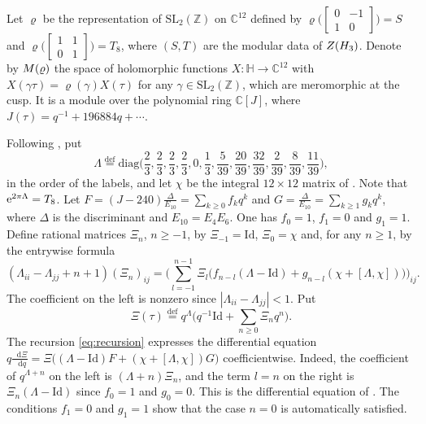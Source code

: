 \documentclass[leqno]{article}
\newcommand{\Cbb}{\ensuremath{\mathbb{C}}}
\newcommand{\diag}{\mathrm{diag}}
\let\cal\relax
\newcommand{\cal}{\mathcal}
\newcommand{\Z}{\ensuremath{\mathbb{Z}}}
\newcommand{\Id}{\mathrm{Id}}
\renewcommand{\geq}{\ensuremath{\geqslant}}
\newcommand{\co}{\colon}
\let\i\relax
\newcommand{\i}{\mathrm{i}}
\newcommand{\ov}{\overset}
\renewcommand{\d}{\mathop{}\mathopen{}\mathrm{d}}
\newcommand{\e}{\mathrm{e}}
\renewcommand{\d}{\mathop{}\mathopen{}\mathrm{d}}
\numberwithin{equation}{section}
\begin{document}
Let $\varrho$ be the representation of $\mathrm{SL}_2(\Z)$ on $\Cbb^{12}$ defined by $\varrho\big(\begin{bmatrix}0&-1\\1&0\end{bmatrix}\big) = S$ and $\varrho\big(\begin{bmatrix}1&1\\0&1\end{bmatrix}\big) = T_8$, where $(S,T)$ are the modular data of $Z(\cal H_3)$. Denote by $\cal M(\varrho)$ the space of holomorphic functions $X \co \mathbb H \to \Cbb^{12}$ with $X(\gamma\tau) = \varrho(\gamma)X(\tau)$ for any $\gamma \in \mathrm{SL}_2(\Z)$, which are meromorphic at the cusp. It is a module over the polynomial ring $\Cbb[J]$, where $J(\tau) = q^{-1}+196884q+\cdots$.

Following \cite[equation (2.7) pp.~21--22]{EvG11}, put
\begin{equation}
\label{eq:Lambda}
\Lambda \ov{\mathrm{def}}{=} \diag\Big(\frac{2}{3},\frac{2}{3},\frac{2}{3},\frac{2}{3},0,\frac{1}{3},\frac{5}{39},\frac{20}{39},\frac{32}{39},\frac{2}{39},\frac{8}{39},\frac{11}{39}\Big),
\end{equation}
in the order of the labels, and let $\chi$ be the integral $12 \times 12$ matrix of \cite[equation (2.7)]{EvG11}. Note that $\e^{2\pi\i\Lambda} = T_8$. Let $F = (J-240)\frac{\Delta}{E_{10}} = \sum_{k \geq 0}f_kq^k$ and $G = \frac{\Delta}{E_{10}} = \sum_{k \geq 1}g_kq^k$, where $\Delta$ is the discriminant and $E_{10} = E_4E_6$. One has $f_0 = 1$, $f_1 = 0$ and $g_1 = 1$. Define rational matrices $\Xi_n$, $n \geq -1$, by $\Xi_{-1} = \Id$, $\Xi_0 = \chi$ and, for any $n \geq 1$, by the entrywise formula
\begin{equation}
\label{eq:recursion}
(\Lambda_{ii}-\Lambda_{jj}+n+1)(\Xi_n)_{ij}
 = \bigg(\sum_{l = -1}^{n-1}\Xi_l\big(f_{n-l}(\Lambda-\Id)+g_{n-l}(\chi+[\Lambda,\chi])\big)\bigg)_{ij}.
\end{equation}
The coefficient on the left is nonzero since $|\Lambda_{ii}-\Lambda_{jj}| < 1$. Put
\begin{equation}
\label{eq:Xi}
\Xi(\tau) \ov{\mathrm{def}}{=} q^{\Lambda}\Big(q^{-1}\Id+\sum_{n \geq 0}\Xi_nq^n\Big).
\end{equation}
The recursion \eqref{eq:recursion} expresses the differential equation $q\frac{\d\Xi}{\d q} = \Xi\big((\Lambda-\Id)F+(\chi+[\Lambda,\chi])G\big)$ coefficientwise. Indeed, the coefficient of $q^{\Lambda+n}$ on the left is $(\Lambda+n)\Xi_n$, and the term $l = n$ on the right is $\Xi_n(\Lambda-\Id)$ since $f_0 = 1$ and $g_0 = 0$. This is the differential equation of \cite[Section 3]{BaG07}. The conditions $f_1 = 0$ and $g_1 = 1$ show that the case $n = 0$ is automatically satisfied.
\end{document}
